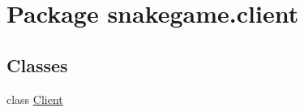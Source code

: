 \hypertarget{namespacesnakegame_1_1client}{}\section{Package snakegame.\+client}
\label{namespacesnakegame_1_1client}
\subsection*{Classes}
\begin{DoxyCompactItemize}
\item 
class \mbox{\hyperlink{classsnakegame_1_1client_1_1_client}{Client}}
\end{DoxyCompactItemize}
